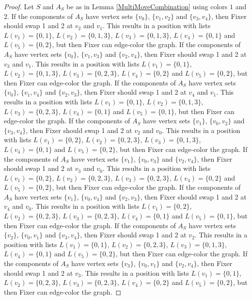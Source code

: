 \documentclass[12pt]{amsart}
\theoremstyle{plain}
\theoremstyle{definition}
\theoremstyle{remark}
\begin{document}
\begin{proof}
Let $S$ and $A_S$ be as in Lemma \ref{MultiMoveCombination} using colors $1$ and $2$. If the components of $A_S$ have vertex sets $\{v_0\}$, $\{v_1, v_2\}$ and $\{v_3, v_4\}$, then Fixer should swap 1 and 2 at $v_2$ and $v_1$. This results in a position with lists $L(v_1) = \{0, 1\}$, $L(v_2) = \{0, 1, 3\}$, $L(v_3) = \{0, 1, 3\}$, $L(v_4) = \{0, 1\}$ and $L(v_5) = \{0, 2\}$, but then Fixer can edge-color the graph.
If the components of $A_S$ have vertex sets $\{v_0\}$, $\{v_1, v_3\}$ and $\{v_2, v_4\}$, then Fixer should swap 1 and 2 at $v_3$ and $v_1$. This results in a position with lists $L(v_1) = \{0, 1\}$, $L(v_2) = \{0, 1, 3\}$, $L(v_3) = \{0, 2, 3\}$, $L(v_4) = \{0, 2\}$ and $L(v_5) = \{0, 2\}$, but then Fixer can edge-color the graph.
If the components of $A_S$ have vertex sets $\{v_0\}$, $\{v_1, v_4\}$ and $\{v_2, v_3\}$, then Fixer should swap 1 and 2 at $v_4$ and $v_1$. This results in a position with lists $L(v_1) = \{0, 1\}$, $L(v_2) = \{0, 1, 3\}$, $L(v_3) = \{0, 2, 3\}$, $L(v_4) = \{0, 1\}$ and $L(v_5) = \{0, 1\}$, but then Fixer can edge-color the graph.
If the components of $A_S$ have vertex sets $\{v_1\}$, $\{v_0, v_2\}$ and $\{v_3, v_4\}$, then Fixer should swap 1 and 2 at $v_2$ and $v_0$. This results in a position with lists $L(v_1) = \{0, 2\}$, $L(v_2) = \{0, 2, 3\}$, $L(v_3) = \{0, 1, 3\}$, $L(v_4) = \{0, 1\}$ and $L(v_5) = \{0, 2\}$, but then Fixer can edge-color the graph.
If the components of $A_S$ have vertex sets $\{v_1\}$, $\{v_0, v_3\}$ and $\{v_2, v_4\}$, then Fixer should swap 1 and 2 at $v_3$ and $v_0$. This results in a position with lists $L(v_1) = \{0, 2\}$, $L(v_2) = \{0, 2, 3\}$, $L(v_3) = \{0, 2, 3\}$, $L(v_4) = \{0, 2\}$ and $L(v_5) = \{0, 2\}$, but then Fixer can edge-color the graph.
If the components of $A_S$ have vertex sets $\{v_1\}$, $\{v_0, v_4\}$ and $\{v_2, v_3\}$, then Fixer should swap 1 and 2 at $v_4$ and $v_0$. This results in a position with lists $L(v_1) = \{0, 2\}$, $L(v_2) = \{0, 2, 3\}$, $L(v_3) = \{0, 2, 3\}$, $L(v_4) = \{0, 1\}$ and $L(v_5) = \{0, 1\}$, but then Fixer can edge-color the graph.
If the components of $A_S$ have vertex sets $\{v_2\}$, $\{v_0, v_1\}$ and $\{v_3, v_4\}$, then Fixer should swap 1 and 2 at $v_2$. This results in a position with lists $L(v_1) = \{0, 1\}$, $L(v_2) = \{0, 2, 3\}$, $L(v_3) = \{0, 1, 3\}$, $L(v_4) = \{0, 1\}$ and $L(v_5) = \{0, 2\}$, but then Fixer can edge-color the graph.
If the components of $A_S$ have vertex sets $\{v_3\}$, $\{v_0, v_1\}$ and $\{v_2, v_4\}$, then Fixer should swap 1 and 2 at $v_3$. This results in a position with lists $L(v_1) = \{0, 1\}$, $L(v_2) = \{0, 2, 3\}$, $L(v_3) = \{0, 2, 3\}$, $L(v_4) = \{0, 2\}$ and $L(v_5) = \{0, 2\}$, but then Fixer can edge-color the graph.

\end{proof}
\end{document}
